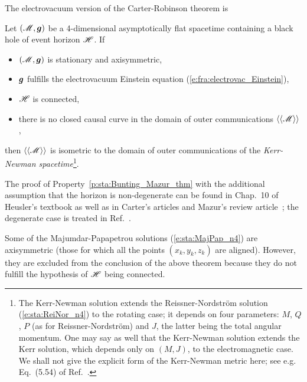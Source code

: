 The electrovacuum version of the Carter-Robinson theorem is

\begin{prop}
\label{p:sta:Bunting_Mazur_thm}
Let $(\mathscr{M},\bm{g})$ be a 4-dimensional asymptotically flat spacetime
containing a black hole of event horizon $\mathscr{H}$. If
\begin{itemize}
\item $(\mathscr{M},\bm{g})$ is stationary and axisymmetric,
\item $\bm{g}$ fulfills the electrovacuum Einstein equation (\ref{e:fra:electrovac_Einstein}),
\item $\mathscr{H}$ is connected,
\item there is no closed causal curve in the domain of outer communications $\langle\langle \mathscr{M}\rangle\rangle$,
\end{itemize}
then $\langle\langle \mathscr{M}\rangle\rangle$ is isometric
to the domain of outer communications of the
\emph{Kerr-Newman spacetime}\footnote{The Kerr-Newman
solution extends the Reissner-Nordström solution (\ref{e:sta:ReiNor_n4}) to
the rotating case; it depends on four parameters: $M$, $Q$, $P$ (as for Reissner-Nordström)
and $J$, the latter being the total angular momentum.
One may say as well that the Kerr-Newman solution extends the Kerr solution,
which depends only on $(M,J)$, to the electromagnetic case.
We shall not give
the explicit form of the Kerr-Newman metric here; see e.g. Eq.~(5.54) of Ref.~\cite{Carte73a}.}.
\end{prop}
The proof of Property~\ref{p:sta:Bunting_Mazur_thm}
with the additional assumption that the horizon is non-degenerate
can be found in Chap.~10 of Heusler's textbook \cite{Heusl96}
as well as in Carter's articles \cite{Carte85,Carte87} and Mazur's review article~\cite{Mazur01}; the degenerate case is treated in
Ref.~\cite{ChrusN10}.

\begin{remark}
Some of the Majumdar-Papapetrou solutions
(\ref{e:sta:MajPap_n4})
are axisymmetric (those for which all the points $(x_k,y_k,z_k)$ are aligned).
However, they are excluded from the conclusion of the above theorem because they
do not fulfill the hypothesis of $\mathscr{H}$ being connected.
\end{remark}

